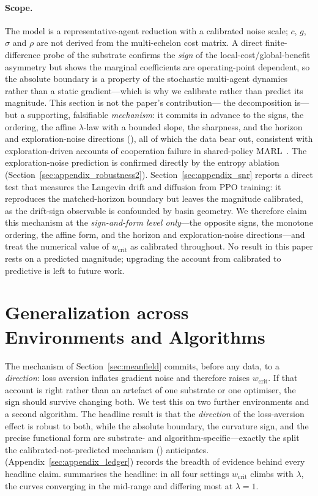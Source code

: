 \documentclass[letterpaper]{article}
\theoremstyle{plain}
\newcommand{\wcrit}{w_{\mathrm{crit}}}
\begin{document}
\paragraph{Scope.} The model is a representative-agent reduction with a
calibrated noise scale; $c$, $g$, $\sigma$ and $\rho$ are not derived from
the multi-echelon cost matrix. A direct finite-difference probe of the
substrate confirms the \emph{sign} of the local-cost/global-benefit
asymmetry but shows the marginal coefficients are operating-point dependent,
so the absolute boundary is a property of the stochastic multi-agent
dynamics rather than a static gradient---which is why we calibrate rather
than predict its magnitude. This section is not the paper's contribution---
the decomposition is---but a supporting, falsifiable \emph{mechanism}: it
commits in advance to the signs, the ordering, the affine $\lambda$-law with
a bounded slope, the sharpness, and the horizon and exploration-noise
directions (), all of which the data bear out, consistent
with exploration-driven accounts of cooperation failure in shared-policy
MARL~\citep{weng2026}. The exploration-noise prediction is confirmed
directly by the entropy ablation (Section~\ref{sec:appendix_robustness2}).
Section~\ref{sec:appendix_snr} reports a direct test that
measures the Langevin drift and diffusion from PPO training: it reproduces
the matched-horizon boundary but leaves the magnitude calibrated, as the
drift-sign observable is confounded by basin geometry.
We therefore claim this mechanism at the \emph{sign-and-form level only}---the
opposite signs, the monotone ordering, the affine form, and the horizon and
exploration-noise directions---and treat the numerical value of $\wcrit$ as
calibrated throughout. No result in this paper rests on a predicted magnitude;
upgrading the account from calibrated to predictive is left to future work.

\section{Generalization across Environments and Algorithms}
\label{sec:generalization}

The mechanism of Section~\ref{sec:meanfield} commits, before any data, to a
\emph{direction}: loss aversion inflates gradient noise and therefore raises
$\wcrit$. If that account is right rather than an artefact of one substrate or
one optimiser, the sign should survive changing both. We test this on two
further environments and a second algorithm. The headline result is that the
\emph{direction} of the loss-aversion effect is robust to both, while the
absolute boundary, the curvature sign, and the precise functional form are
substrate- and algorithm-specific---exactly the split the calibrated-not-predicted
mechanism () anticipates. 
(Appendix~\ref{sec:appendix_ledger}) records the breadth of evidence behind every
headline claim.
 summarises the headline: in all four settings
$\wcrit$ climbs with $\lambda$, the curves converging in the mid-range and
differing most at $\lambda{=}1$.
\end{document}
